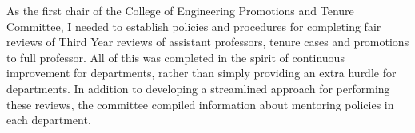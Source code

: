 As the first chair of the College of Engineering Promotions and Tenure
Committee, I needed to establish policies and procedures for completing fair
reviews of Third Year reviews of assistant professors, tenure cases and
promotions to full professor.  All of this was completed in the spirit of
continuous improvement for departments, rather than simply providing an extra
hurdle for departments.  In addition to developing a streamlined approach for
performing these reviews, the committee compiled information about mentoring
policies in each department.
